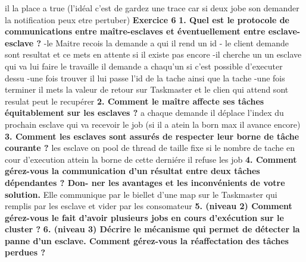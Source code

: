 \documentclass{article}
\begin{document}
il la place a true (l'idéal c'est de gardez une trace car si deux jobe son demander la notification peux etre pertuber)
\newline
\newline
\textbf{Exercice 6}
\newline
\textbf{1. Quel est le protocole de communications entre maître-esclaves et éventuellement entre
esclave-esclave ?}
-le Maitre recois la demande a qui il rend un id
- le client demande sont resultat et ce mets en attente si il existe pas encore
-il cherche un un esclave qui va lui faire le travaille il demande a chaqu'un si c'est possible
d'executer dessu
-une fois trouver il lui passe l'id de la tache ainsi que la tache
-une fois terminer il mets la valeur de retour sur Taskmaster et le clien qui attend sont resulat
peut le recupérer
\newline
\newline
\textbf{2. Comment le maître affecte ses tâches équitablement sur les esclaves ?}
\newline
a chaque demande il déplace l'index du prochain esclave qui va recevoir le job (si il a atein la born max il avance encore)
\newline
\textbf{3. Comment les esclaves sont assurés de respecter leur borne de tâche courante ?}
\newline
les esclave on pool de thread de taille fixe si le nombre de tache en cour d'execution attein la borne de cette derniére il refuse les job
\newline
\textbf{4. Comment gérez-vous la communication d’un résultat entre deux tâches dépendantes ? Don-
ner les avantages et les inconvénients de votre solution.}
\newline
Elle communique par le biellet d'une map sur le Taskmaster qui remplis par les esclave et vider par les consomateur
\newline
\textbf{5. (niveau 2) Comment gérez-vous le fait d’avoir plusieurs jobs en cours d’exécution sur le
cluster ?}
\newline
\newline
\textbf{6. (niveau 3) Décrire le mécanisme qui permet de détecter la panne d’un esclave. Comment
gérez-vous la réaffectation des tâches perdues ?}
\end{document}
